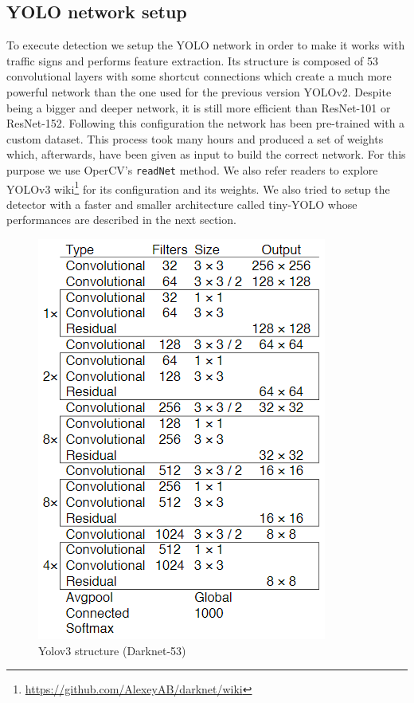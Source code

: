 \subsection{YOLO network setup}
To execute detection we setup the YOLO network in order to make it works with traffic signs and performs feature extraction. Its structure is composed of 53 convolutional layers with some shortcut connections which create a much more powerful network than the one used for the previous version YOLOv2. Despite being a bigger and deeper network, it is still more efficient than ResNet-101 or ResNet-152. Following this configuration the network has been pre-trained with a custom dataset. This process took many hours and produced a set of weights which, afterwards, have been given as input to build the correct network. For this purpose we use OperCV's \texttt{readNet} method. We also refer readers to explore YOLOv3 wiki\footnote{\url{https://github.com/AlexeyAB/darknet/wiki}} for its configuration and its weights. We also tried to setup the detector with a faster and smaller architecture called tiny-YOLO \cite{tinyYolo} whose performances are described in the next section.
\begin{figure}[h]
	\centering\includegraphics[scale=0.7]{Res/Immagini/darknet53.PNG}	
	\caption{Yolov3 structure (Darknet-53)}
\end{figure}


